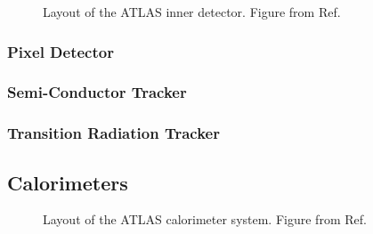\begin{figure}[ht]
\centering
{}
\caption{Layout of the ATLAS inner detector. Figure from Ref. \cite{Potamianos:2016ptf}}
\label{fig:atlas:id}
\end{figure}


\subsubsection*{Pixel Detector}


\subsubsection*{Semi-Conductor Tracker}


\subsubsection*{Transition Radiation Tracker}



\subsection{Calorimeters}

\begin{figure}[ht]
\centering
{}
\caption{Layout of the ATLAS calorimeter system. Figure from Ref. \cite{atlas:atlas}}
\label{fig:atlas:calo}
\end{figure}

